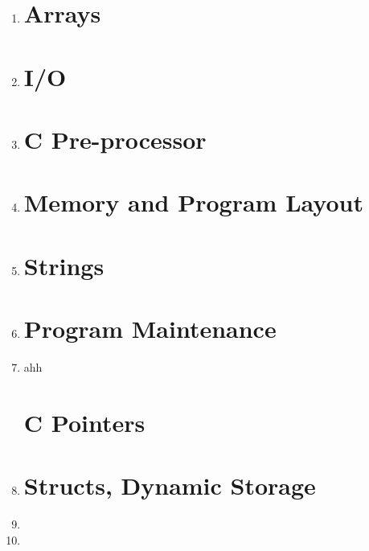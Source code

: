\documentclass[11pt]{article}
\begin{document}
\begin{enumerate}
	\item 

\section*{Arrays}
	
	\item 

\section*{I/O}

	\item 

\section*{C Pre-processor}

	\item 

\newpage
\section*{Memory and Program Layout}

	\item 

\section*{Strings}

	\item 

\section*{Program Maintenance}

	\item ahh

\newpage
\section*{C Pointers}

	\item 

\pagebreak
\section*{Structs, Dynamic Storage}

	\item 
	\item 

\end{enumerate}
\end{document}
